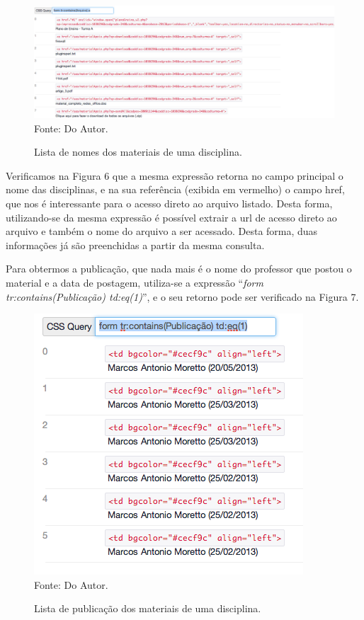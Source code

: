 \begin{figure}[!htb]
     \centering
     \caption[Extração de Informações - Lista de Nomes dos Materiais de uma disciplina]{Lista de nomes dos materiais de uma disciplina.}
     \includegraphics[scale=0.35]{imagens/listamateriaisdisciplinasnomematerial.png}
     \\  Fonte: Do Autor.
\end{figure}

Verificamos na Figura 6 que a mesma expressão retorna no campo principal o nome das disciplinas, e na sua referência (exibida em vermelho) o campo href, que nos é interessante para o acesso direto ao arquivo listado. Desta forma, utilizando-se da mesma expressão é possível extrair a url de acesso direto ao arquivo e também o nome do arquivo a ser acessado. Desta forma, duas informações já são preenchidas a partir da mesma consulta. 

Para obtermos a publicação, que nada mais é o nome do professor que postou o material e a data de postagem, utiliza-se a expressão ``\emph{form tr:contains(Publicação) td:eq(1)}'', e o seu retorno pode ser verificado na Figura 7.

\begin{figure}[!htb]
     \centering     
     \caption[Extração de Informações - Lista das publicações dos materiais]{Lista de publicação dos materiais de uma disciplina.}
     \includegraphics[scale=0.7]{imagens/listamateriaisdisciplinaspublicacao.png}
     \\  Fonte: Do Autor.
\end{figure}


